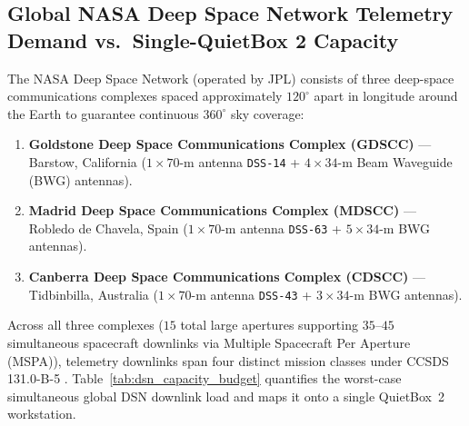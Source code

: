 \documentclass[10pt]{article}
\begin{document}
\subsection{Global NASA Deep Space Network Telemetry Demand vs.\ Single-QuietBox 2 Capacity}

The NASA Deep Space Network (operated by JPL) consists of three deep-space communications complexes spaced approximately $120^\circ$ apart in longitude around the Earth to guarantee continuous $360^\circ$ sky coverage:
\begin{enumerate}[leftmargin=1.8em, itemsep=1pt]
    \item \textbf{Goldstone Deep Space Communications Complex (GDSCC)} --- Barstow, California ($1 \times 70\text{-m}$ antenna \texttt{DSS-14} + $4 \times 34\text{-m}$ Beam Waveguide (BWG) antennas).
    \item \textbf{Madrid Deep Space Communications Complex (MDSCC)} --- Robledo de Chavela, Spain ($1 \times 70\text{-m}$ antenna \texttt{DSS-63} + $5 \times 34\text{-m}$ BWG antennas).
    \item \textbf{Canberra Deep Space Communications Complex (CDSCC)} --- Tidbinbilla, Australia ($1 \times 70\text{-m}$ antenna \texttt{DSS-43} + $3 \times 34\text{-m}$ BWG antennas).
\end{enumerate}

Across all three complexes ($15$ total large apertures supporting $35\text{--}45$ simultaneous spacecraft downlinks via Multiple Spacecraft Per Aperture (MSPA)), telemetry downlinks span four distinct mission classes under CCSDS 131.0-B-5 \cite{ccsds_tm_coding}. Table~\ref{tab:dsn_capacity_budget} quantifies the worst-case simultaneous global DSN downlink load and maps it onto a single QuietBox~2 workstation.
\end{document}
